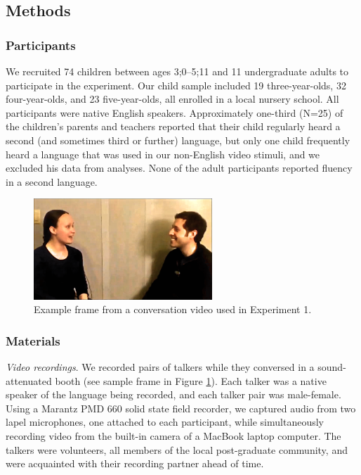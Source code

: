 \documentclass[authoryear, 12pt]{elsarticle}
\begin{document}
\subsection{Methods}
\label{sec:methods1}

\subsubsection{Participants}

We recruited 74 children between ages 3;0--5;11 and 11 undergraduate adults to participate in the experiment. Our child sample included 19 three-year-olds, 32 four-year-olds, and 23 five-year-olds, all enrolled in a local nursery school. All participants were native English speakers. Approximately one-third (N=25) of the children's parents and teachers reported that their child regularly heard a second (and sometimes third or further) language, but only one child frequently heard a language that was used in our non-English video stimuli, and we excluded his data from analyses. None of the adult participants reported fluency in a second language.

\begin{figure}[t]
\begin{center}
\includegraphics[width=0.6\textwidth]{figures/FIG-FL-stim.png}
\end{center}
\caption{Example frame from a conversation video used in Experiment 1.} 
\label{fig:speakers}
\end{figure}

\subsubsection{Materials}

\textit{Video recordings}. We recorded pairs of talkers while they conversed in a sound-attenuated booth (see sample frame in Figure \ref{fig:speakers}). Each talker was a native speaker of the language being recorded, and each talker pair was male-female. Using a Marantz PMD 660 solid state field recorder, we captured audio from two lapel microphones, one attached to each participant, while simultaneously recording video from the built-in camera of a MacBook laptop computer. The talkers were volunteers, all members of the local post-graduate community, and were acquainted with their recording partner ahead of time. 
\end{document}
